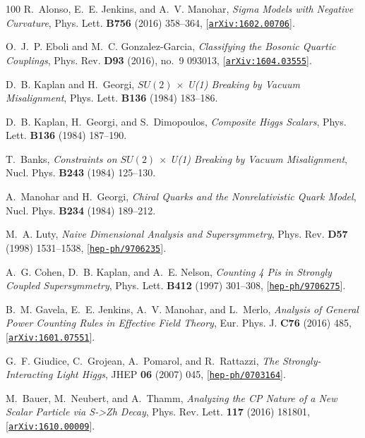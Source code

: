 \documentclass[11pt]{article}
\renewcommand{\[}{\begin{equation}}
\renewcommand{\]}{\end{equation}}
\begin{document}
\begin{thebibliography}{100}
R.~Alonso, E.~E. Jenkins, and A.~V. Manohar, {\it {Sigma Models with Negative
  Curvature}},  Phys. Lett. {\bf B756} (2016) 358--364,
  [\href{http://xxx.lanl.gov/abs/1602.00706}{{\tt arXiv:1602.00706}}].

O.~J.~P. Eboli and M.~C. Gonzalez-Garcia, {\it {Classifying the Bosonic Quartic
  Couplings}},  Phys. Rev. {\bf D93} (2016), no.~9 093013,
  [\href{http://xxx.lanl.gov/abs/1604.03555}{{\tt arXiv:1604.03555}}].

D.~B. Kaplan and H.~Georgi, {\it {$SU(2)$ $\times$ U(1) Breaking by Vacuum
  Misalignment}},  Phys. Lett. {\bf B136} (1984) 183--186.

D.~B. Kaplan, H.~Georgi, and S.~Dimopoulos, {\it {Composite Higgs Scalars}},
  Phys. Lett. {\bf B136} (1984) 187--190.

T.~Banks, {\it {Constraints on $SU(2)$ $\times$ U(1) Breaking by Vacuum
  Misalignment}},  Nucl. Phys. {\bf B243} (1984) 125--130.

A.~Manohar and H.~Georgi, {\it {Chiral Quarks and the Nonrelativistic Quark
  Model}},  Nucl. Phys. {\bf B234} (1984) 189--212.

M.~A. Luty, {\it {Naive Dimensional Analysis and Supersymmetry}},  Phys. Rev.
  {\bf D57} (1998) 1531--1538,
  [\href{http://xxx.lanl.gov/abs/hep-ph/9706235}{{\tt hep-ph/9706235}}].

A.~G. Cohen, D.~B. Kaplan, and A.~E. Nelson, {\it {Counting 4 Pis in Strongly
  Coupled Supersymmetry}},  Phys. Lett. {\bf B412} (1997) 301--308,
  [\href{http://xxx.lanl.gov/abs/hep-ph/9706275}{{\tt hep-ph/9706275}}].

B.~M. Gavela, E.~E. Jenkins, A.~V. Manohar, and L.~Merlo, {\it {Analysis of
  General Power Counting Rules in Effective Field Theory}}, Eur. Phys. J. {\bf C76} (2016) 485,
  [\href{http://xxx.lanl.gov/abs/1601.07551}{{\tt arXiv:1601.07551}}].

G.~F. Giudice, C.~Grojean, A.~Pomarol, and R.~Rattazzi, {\it {The
  Strongly-Interacting Light Higgs}},  JHEP {\bf 06} (2007) 045,
  [\href{http://xxx.lanl.gov/abs/hep-ph/0703164}{{\tt hep-ph/0703164}}].


M.~Bauer, M.~Neubert, and A.~Thamm, {\it {Analyzing the CP Nature of a New
  Scalar Particle via S->Zh Decay}},  Phys. Rev. Lett. {\bf 117} (2016) 181801,
  [\href{http://xxx.lanl.gov/abs/1610.00009}{{\tt arXiv:1610.00009}}].


\end{thebibliography}
\end{document}
